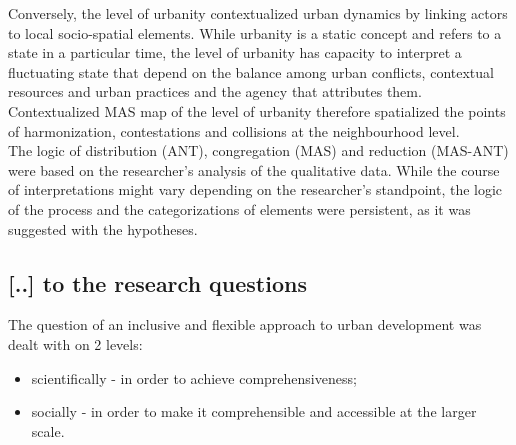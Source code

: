 \documentclass[11pt]{report}
\begin{document}
Conversely, the level of urbanity contextualized urban dynamics by linking actors to local socio-spatial elements. 
While urbanity is a static concept and refers to a state in a particular time, the level of urbanity has capacity to interpret a fluctuating state that depend on the balance among urban conflicts, contextual resources and urban practices and the agency that attributes them.
Contextualized MAS map of the level of urbanity therefore spatialized the points of harmonization, contestations and collisions at the neighbourhood level.
\\
The logic of distribution (ANT), congregation (MAS) and reduction (MAS-ANT) were based on the researcher's analysis of the qualitative data. While the course of 
interpretations might vary depending on the researcher's standpoint, the logic of the process and the categorizations of elements were persistent, as it was suggested with the hypotheses.

\subsection{[..] to the research questions}

The question of an inclusive and flexible approach to urban development was dealt with on 2 levels:
\begin{itemize}
\item scientifically - in order to achieve comprehensiveness;
\item socially - in order to make it comprehensible and accessible at the larger scale.
\end{itemize}
\end{document}
